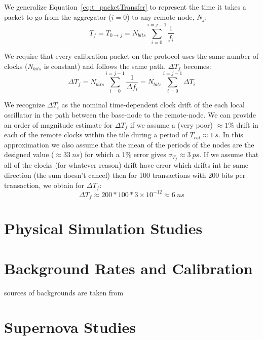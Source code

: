 We generalize Equation~\ref{eq:t_packetTransfer} to represent the time it takes a packet to go from the aggregator ($i = 0$) to any remote node, $N_{j}$:
\begin{equation}
  T_{f} = T_{0\rightarrow j} = N_{bits}\sum_{i=0}^{i=j-1}\frac{1}{f_{i}}
\end{equation}

We require that every calibration packet on the protocol uses the same number of clocks ($N_{bits}$ is constant) and follows the same path. $\Delta T_{f}$ becomes:
\begin{equation}
  \Delta T_{f} = N_{bits}\sum_{i=0}^{i=j-1}\frac{1}{\Delta f_{i}} = N_{bits} \sum_{i=0}^{i=j-1}\Delta T_{i}
\end{equation}

We recognize $\Delta T_{i}$ as the nominal time-dependent clock drift of the each local oscillator in the path between the base-node to the remote-node.
We can provide an order of magnitude estimate for $\Delta T_{f}$ if we assume a (very poor) $\approx 1\%$ drift in each of the remote clocks within the tile during a period of $T_{cal} \approx 1~\unit{s}$.
In this approximation we also assume that the mean of the periods of the nodes are the designed value ($\approx 33~\unit{ns}$) for which a 1\% error gives $\sigma_{T_{f}} \approx 3~\unit{ps}$.
If we assume that all of the clocks (for whatever reason) drift have error which drifts int he same direction (the sum doesn't cancel) then for 100 transactions with 200 bits per transaction, we obtain for $\Delta T_{f}$:
\begin{equation}
  \Delta T_{f} \approx 200 * 100 * 3\times 10^{-12} \approx 6~\unit{ns}
\end{equation}


\section{Physical Simulation Studies}

\section{Background Rates and Calibration}

sources of backgrounds are taken from \citep{DUNE-FD_TDRv4:Abi_2020}

\section{Supernova Studies}

